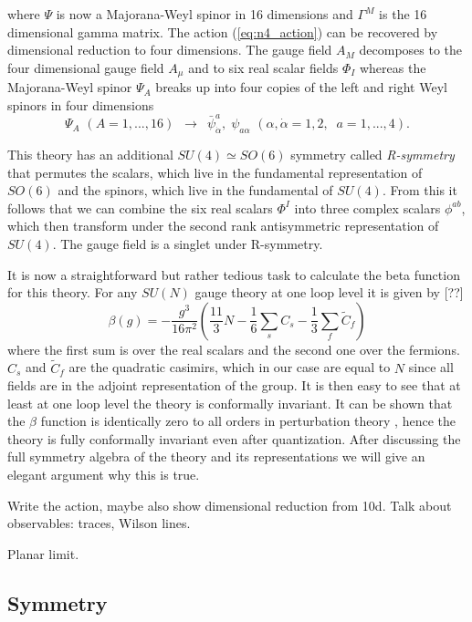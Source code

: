 where $\Psi$ is now a Majorana-Weyl spinor in 16 dimensions and $\Gamma^M$ is the 16 dimensional gamma matrix. The action (\ref{eq:n4_action}) can be recovered by dimensional reduction to four dimensions. The gauge field $A_M$ decomposes to the four dimensional gauge field $A_\mu$ and to six real scalar fields $\Phi_I$ whereas the Majorana-Weyl spinor $\Psi_A$ breaks up into four copies of the left and right Weyl spinors in four dimensions 
\begin{equation}
	\Psi_A \, \, (A = 1, ..., 16) \, \, \, \rightarrow \, \, \,  \bar{\psi}^a_{\dot{\alpha}}, \; \psi_{a\alpha} \, \, (\alpha, \dot{\alpha} = 1, 2, \; \; a = 1, ..., 4).
\end{equation}

This theory has an additional $SU(4) \simeq SO(6)$ symmetry called \emph{R-symmetry} that permutes the scalars, which live in the fundamental representation of $SO(6)$ and the spinors, which live in the fundamental of $SU(4)$. From this it follows that we can combine the six real scalars $\Phi^I$ into three complex scalars $\phi^{ab}$, which then transform under the second rank antisymmetric representation of $SU(4)$. The gauge field is a singlet under R-symmetry.

It is now a straightforward but rather tedious task to calculate the beta function for this theory. For any $SU(N)$ gauge theory at one loop level it is given by [??]
\begin{equation}
	\beta(g) = - \frac{g^3}{16\pi^2} \left( \frac{11}{3} N - \frac{1}{6} \sum_s C_s - \frac{1}{3} \sum_f \tilde{C}_f \right)
\end{equation}
where the first sum is over the real scalars and the second one over the fermions. $C_s$ and $\tilde{C}_f$ are the quadratic casimirs, which in our case are equal to $N$ since all fields are in the adjoint representation of the group. It is then easy to see that at least at one loop level the theory is conformally invariant. It can be shown that the $\beta$ function is identically zero to all orders in perturbation theory \cite{beisert_all_loops}, hence the theory is fully conformally invariant even after quantization. After discussing the full symmetry algebra of the theory and its representations we will give an elegant argument why this is true.

Write the action, maybe also show dimensional reduction from 10d. Talk about observables: traces, Wilson lines. 

Planar limit.

\subsection{Symmetry}



